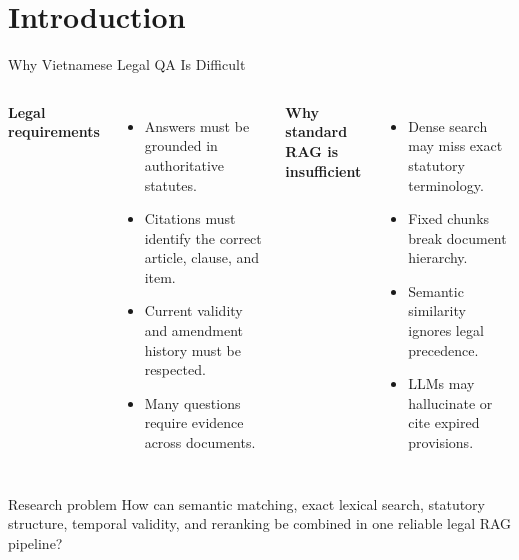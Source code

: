\section{Introduction}

\begin{frame}{Why Vietnamese Legal QA Is Difficult}
\small
\begin{columns}[T]
    \textbf{Legal requirements}
    \begin{itemize}
      \item Answers must be grounded in authoritative statutes.
      \item Citations must identify the correct article, clause, and item.
      \item Current validity and amendment history must be respected.
      \item Many questions require evidence across documents.
    \end{itemize}
    \textbf{Why standard RAG is insufficient}
    \begin{itemize}
      \item Dense search may miss exact statutory terminology.
      \item Fixed chunks break document hierarchy.
      \item Semantic similarity ignores legal precedence.
      \item LLMs may hallucinate or cite expired provisions.
    \end{itemize}
\end{columns}
\vspace{0.2cm}
\begin{alertblock}{Research problem}
How can semantic matching, exact lexical search, statutory structure, temporal validity, and reranking be combined in one reliable legal RAG pipeline?
\end{alertblock}
\end{frame}

